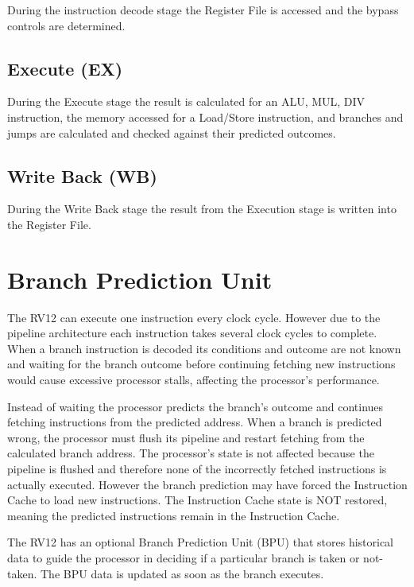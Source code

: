 During the instruction decode stage the Register File is accessed and the bypass
controls are determined.

\subsection{Execute (EX)} \label{execute-ex}

During the Execute stage the result is calculated for an ALU, MUL, DIV
instruction, the memory accessed for a Load/Store instruction, and branches and
jumps are calculated and checked against their predicted outcomes.

\subsection{Write Back (WB)} \label{write-back-wb}

During the Write Back stage the result from the Execution stage is written into
the Register File.

\section{Branch Prediction Unit} \label{branch-prediction-unit}

The RV12 can execute one instruction every clock cycle.  However due to the
pipeline architecture each instruction takes several clock cycles to complete.
When a branch instruction is decoded its conditions and outcome are not known
and waiting for the branch outcome before continuing fetching new instructions
would cause excessive processor stalls, affecting the processor's performance.

Instead of waiting the processor predicts the branch's outcome and continues
fetching instructions from the predicted address. When a branch is predicted
wrong, the processor must flush its pipeline and restart fetching from the
calculated branch address.  The processor's state is not affected because the
pipeline is flushed and therefore none of the incorrectly fetched instructions
is actually executed.  However the branch prediction may have forced the
Instruction Cache to load new instructions.  The Instruction Cache state is NOT
restored, meaning the predicted instructions remain in the Instruction Cache.

The RV12 has an optional Branch Prediction Unit (BPU) that stores historical
data to guide the processor in deciding if a particular branch is taken or not-
taken.  The BPU data is updated as soon as the branch executes.

